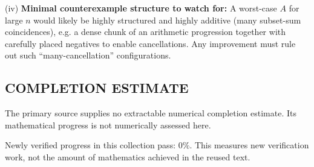 (iv) \textbf{Minimal counterexample structure to watch for:} A worst-case $A$ for large $n$ would likely be highly structured and highly additive (many subset-sum coincidences), e.g. a dense chunk of an arithmetic progression together with carefully placed negatives to enable cancellations. Any improvement must rule out such ``many-cancellation'' configurations.

\bigskip



\subsection*{COMPLETION ESTIMATE}
The primary source supplies no extractable numerical completion estimate. Its mathematical progress is not numerically assessed here.

Newly verified progress in this collection pass: $0\%$. This measures new verification work, not the amount of mathematics achieved in the reused text.
